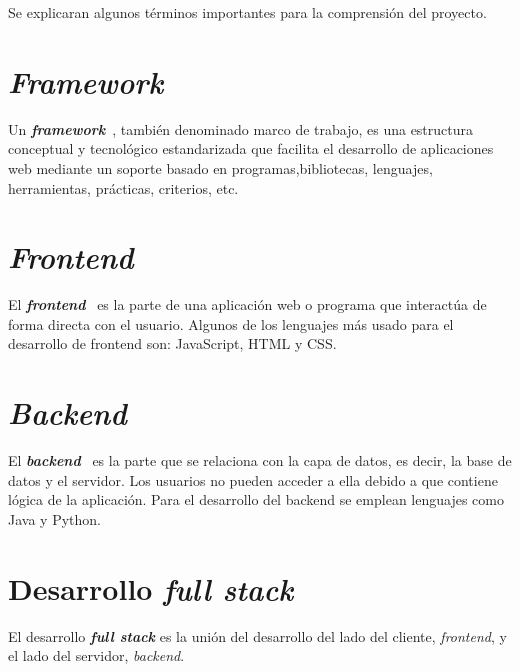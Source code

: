 
Se explicaran algunos términos importantes para la comprensión del proyecto.

\section{\textit{Framework}}
Un \textbf{\textit{framework}}~\cite{framework_definicion}, también denominado marco de trabajo, es una estructura conceptual y tecnológico estandarizada que facilita el desarrollo de aplicaciones web mediante un soporte basado en programas,bibliotecas, lenguajes, herramientas, prácticas, criterios, etc.

\section{\textit{Frontend}}
El \textbf{\textit{frontend}}~\cite{frontend_backend} es la parte de una aplicación web o programa que interactúa de forma directa con el usuario. Algunos de los lenguajes más usado para el desarrollo de frontend son: JavaScript, HTML y CSS.

\section{\textit{Backend}}
El \textbf{\textit{backend}}~\cite{frontend_backend} es la parte que se relaciona con la capa de datos, es decir, la base de datos y el servidor. Los usuarios no pueden acceder a ella debido a que contiene lógica de la aplicación. Para el desarrollo del backend se emplean lenguajes como Java y Python.

\section{Desarrollo \textit{full stack}}
El desarrollo \textbf{\textit{full stack}} es la unión del desarrollo del lado del cliente, \textit{frontend}, y el lado del servidor, \textit{backend}.